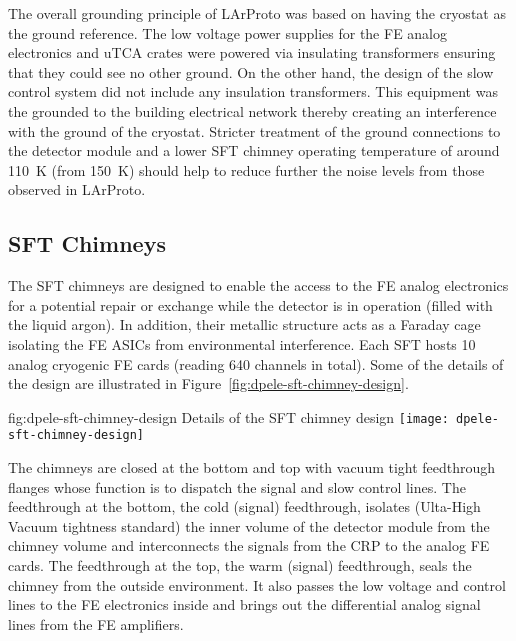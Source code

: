 The overall grounding principle of LArProto was based on having the cryostat as the ground reference. The low voltage power supplies for the FE analog electronics and uTCA crates were powered via insulating transformers ensuring that they could see no other ground. On the other hand, the design of the slow control system did not include any insulation transformers. This equipment was the grounded to the building electrical network thereby creating an interference with the ground of the cryostat. Stricter treatment of the ground connections to the detector module  and a lower SFT chimney operating temperature of around \SI{110}{\kelvin} (from \SI{150}{\kelvin}) should help to reduce further the noise levels from those observed in LArProto.


\subsection{SFT Chimneys}
\label{sec:fddp-tpc-elec-design-sft}

The SFT chimneys are designed to enable the access to the FE analog electronics for a potential repair or exchange while the detector is in operation (filled with the liquid argon). In addition, their metallic structure acts as a Faraday cage isolating the FE ASICs from environmental interference.  Each SFT hosts \num{10} analog cryogenic FE cards (reading \num{640} channels in total).  Some of the details of the design are illustrated in Figure~\ref{fig:dpele-sft-chimney-design}. 

\begin{dunefigure}{fig:dpele-sft-chimney-design}
{Details of the SFT chimney design}
\texttt{[image: dpele-sft-chimney-design]}
\end{dunefigure}

The chimneys are closed at the bottom and top with vacuum tight feedthrough flanges whose function is to dispatch the signal and slow control lines. The feedthrough at the bottom, the cold (signal) feedthrough, isolates (Ulta-High Vacuum tightness standard) the inner volume of the detector module from the chimney volume and interconnects the signals from the CRP to the analog FE cards. The feedthrough at the top, the warm (signal) feedthrough, seals the chimney from the outside environment. It also passes the low voltage and control lines to the FE electronics inside and brings out the differential analog signal lines from the FE amplifiers. 

